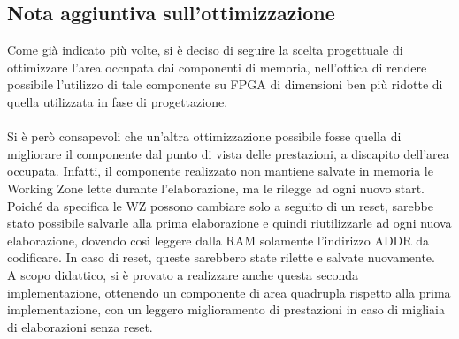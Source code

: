 \documentclass{article}
\begin{document}
\subsection{Nota aggiuntiva sull'ottimizzazione}
Come già indicato più volte, si è deciso di seguire la scelta progettuale di ottimizzare l'area occupata dai componenti di memoria, nell'ottica di rendere possibile l'utilizzo di tale componente su FPGA di dimensioni ben più ridotte di quella utilizzata in fase di progettazione.\\\\Si è però consapevoli che un'altra ottimizzazione possibile fosse quella di migliorare il componente dal punto di vista delle prestazioni, a discapito dell'area occupata. Infatti, il componente realizzato non mantiene salvate in memoria le Working Zone lette durante l'elaborazione, ma le rilegge ad ogni nuovo start.
Poiché da specifica le WZ possono cambiare solo a seguito di un reset, sarebbe stato possibile salvarle alla prima elaborazione e quindi riutilizzarle ad ogni nuova elaborazione, dovendo così leggere dalla RAM solamente l'indirizzo ADDR da codificare. In caso di reset, queste sarebbero state rilette e salvate nuovamente.\\A scopo didattico, si è provato a realizzare anche questa seconda implementazione, ottenendo un componente di area quadrupla rispetto alla prima implementazione, con un leggero miglioramento di prestazioni in caso di migliaia di elaborazioni senza reset.
\end{document}
